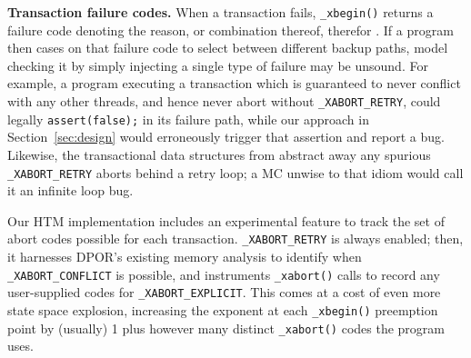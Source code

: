 \documentclass[10pt]{sigplanconf}
\begin{document}
{\bf Transaction failure codes.}
When a transaction fails, {\tt \_xbegin()} returns a failure code
denoting the reason, or combination thereof, therefor \cite{htm-gcc}.
If a program then cases on that failure code to select between different backup paths,
model checking it by simply injecting a single type of failure may be unsound.
For example, a program executing a transaction which is guaranteed to never conflict with any other threads,
and hence never abort without {\tt \_XABORT\_RETRY},
could legally {\tt assert(false);} in its failure path,
while our approach in Section~\ref{sec:design} would erroneously trigger that assertion and report a bug.
Likewise, the transactional data structures from \cite{htm-mario}
abstract away any spurious {\tt \_XABORT\_RETRY} aborts behind a retry loop;
a MC unwise to that idiom would call it an infinite loop bug.

Our HTM implementation includes an experimental feature
to track the set of abort codes possible for each transaction.
{\tt \_XABORT\_RETRY} is always enabled;
then,
it harnesses DPOR's existing memory analysis to identify when {\tt \_XABORT\_CONFLICT} is possible,
and instruments {\tt \_xabort()} calls to record any user-supplied codes for {\tt \_XABORT\_EXPLICIT}.
This comes at a cost of even more state space explosion,
increasing the exponent at each {\tt \_xbegin()} preemption point
by (usually) 1 plus however many distinct {\tt \_xabort()} codes the program uses.
\end{document}
